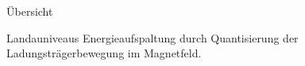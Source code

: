 \documentclass[../defence.tex]{subfiles}
\begin{document}
  \begin{frame}{Übersicht}
    \begin{block}{Landauniveaus}
      Energieaufspaltung durch Quantisierung der Ladungsträgerbewegung im Magnetfeld.
    \end{block}
  \end{frame}
\end{document}
